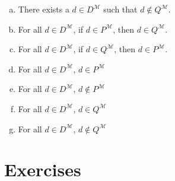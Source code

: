 \begin{enumerate}[\thesection.1]
\begin{enumerate}[(a)]
\item There exists a $d\in D^\mathcal{M}$ such that $d\notin
  Q^\mathcal{M}$.

\item For all $d\in D^\mathcal{M}$, if $d\in P^\mathcal{M}$, then
  $d\in Q^\mathcal{M}$.

\item For all $d\in D^\mathcal{M}$, if $d\in Q^\mathcal{M}$, then
  $d\in P^\mathcal{M}$.

\item For all $d\in D^\mathcal{M}$, $d\in P^\mathcal{M}$

\item For all $d\in D^\mathcal{M}$, $d\notin P^\mathcal{M}$

\item For all $d\in D^\mathcal{M}$, $d\in Q^\mathcal{M}$
  
\item For all $d\in D^\mathcal{M}$, $d\notin Q^\mathcal{M}$
  
\end{enumerate}
  
\end{enumerate}

\section{Exercises}
	
